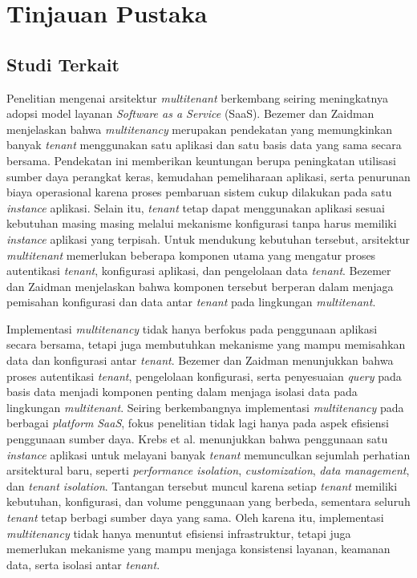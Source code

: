\chapter{Tinjauan Pustaka}

\section{Studi Terkait}

Penelitian mengenai arsitektur \textit{multitenant} berkembang seiring meningkatnya adopsi model layanan \textit{Software as a Service} (SaaS). Bezemer dan Zaidman \cite{ref3} menjelaskan bahwa \textit{multitenancy} merupakan pendekatan yang memungkinkan banyak \textit{tenant} menggunakan satu aplikasi dan satu basis data yang sama secara bersama. Pendekatan ini memberikan keuntungan berupa peningkatan utilisasi sumber daya perangkat keras, kemudahan pemeliharaan aplikasi, serta penurunan biaya operasional karena proses pembaruan sistem cukup dilakukan pada satu \textit{instance} aplikasi. Selain itu, \textit{tenant} tetap dapat menggunakan aplikasi sesuai kebutuhan masing masing melalui mekanisme konfigurasi tanpa harus memiliki \textit{instance} aplikasi yang terpisah. Untuk mendukung kebutuhan tersebut, arsitektur \textit{multitenant} memerlukan beberapa komponen utama yang mengatur proses autentikasi \textit{tenant}, konfigurasi aplikasi, dan pengelolaan data \textit{tenant}. Bezemer dan Zaidman \cite{ref3} menjelaskan bahwa komponen tersebut berperan dalam menjaga pemisahan konfigurasi dan data antar \textit{tenant} pada lingkungan \textit{multitenant}.

Implementasi \textit{multitenancy} tidak hanya berfokus pada penggunaan aplikasi secara bersama, tetapi juga membutuhkan mekanisme yang mampu memisahkan data dan konfigurasi antar \textit{tenant}. Bezemer dan Zaidman \cite{ref3} menunjukkan bahwa proses autentikasi \textit{tenant}, pengelolaan konfigurasi, serta penyesuaian \textit{query} pada basis data menjadi komponen penting dalam menjaga isolasi data pada lingkungan \textit{multitenant}. Seiring berkembangnya implementasi \textit{multitenancy} pada berbagai \textit{platform} \textit{SaaS}, fokus penelitian tidak lagi hanya pada aspek efisiensi penggunaan sumber daya. Krebs et al. \cite{ref4} menunjukkan bahwa penggunaan satu \textit{instance} aplikasi untuk melayani banyak \textit{tenant} memunculkan sejumlah perhatian arsitektural baru, seperti \textit{performance isolation}, \textit{customization}, \textit{data management}, dan \textit{tenant isolation}. Tantangan tersebut muncul karena setiap \textit{tenant} memiliki kebutuhan, konfigurasi, dan volume penggunaan yang berbeda, sementara seluruh \textit{tenant} tetap berbagi sumber daya yang sama. Oleh karena itu, implementasi \textit{multitenancy} tidak hanya menuntut efisiensi infrastruktur, tetapi juga memerlukan mekanisme yang mampu menjaga konsistensi layanan, keamanan data, serta isolasi antar \textit{tenant}.

